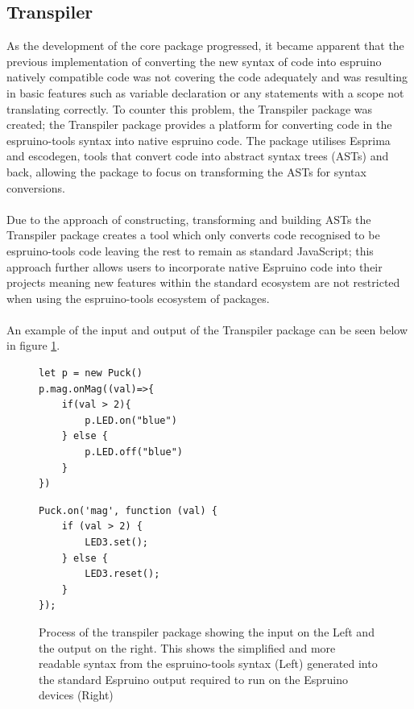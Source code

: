 \documentclass{l4proj}
\begin{document}
\subsection{Transpiler}
As the development of the core package progressed, it became apparent that the previous implementation of converting the new syntax of code into espruino natively compatible code was not covering the code adequately and was resulting in basic features such as variable declaration or any statements with a scope not translating correctly. To counter this problem, the Transpiler package was created; the Transpiler package provides a platform for converting code in the espruino-tools syntax into native espruino code. The package utilises Esprima and escodegen, tools that convert code into abstract syntax trees (ASTs) and back, allowing the package to focus on transforming the ASTs for syntax conversions.
\\ \\
Due to the approach of constructing, transforming and building ASTs the Transpiler package creates a tool which only converts code recognised to be espruino-tools code leaving the rest to remain as standard JavaScript; this approach further allows users to incorporate native Espruino code into their projects meaning new features within the standard ecosystem are not restricted when using the espruino-tools ecosystem of packages.
\\ \\ 
An example of the input and output of the Transpiler package can be seen below in figure \ref{fig:transpiler-input-output}.

\begin{figure}[!ht]
\centering
\begin{minipage}{6cm}
  \centering
  \begin{lstlisting}
let p = new Puck()
p.mag.onMag((val)=>{
    if(val > 2){
        p.LED.on("blue")
    } else {
        p.LED.off("blue")
    }
})

  \end{lstlisting}
\end{minipage}
\hspace{0.5cm}
\begin{minipage}{6cm}
  \centering
  
  \begin{lstlisting}
Puck.on('mag', function (val) {
    if (val > 2) {
        LED3.set();
    } else {
        LED3.reset();
    }
});
  \end{lstlisting}
\end{minipage}


  \caption{Process of the transpiler package showing the input on the Left and the output on the right. This shows the simplified and more readable syntax from the espruino-tools syntax (Left) generated into the standard Espruino output required to run on the Espruino devices (Right)}
  \label{fig:transpiler-input-output}

\end{figure}
\end{document}
